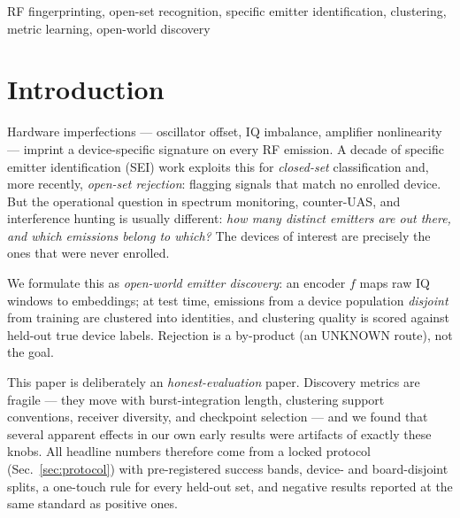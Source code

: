 \documentclass[conference]{IEEEtran}
\begin{document}
\begin{IEEEkeywords}
RF fingerprinting, open-set recognition, specific emitter identification, clustering,
metric learning, open-world discovery
\end{IEEEkeywords}

\section{Introduction}

Hardware imperfections --- oscillator offset, IQ imbalance, amplifier nonlinearity --- imprint a
device-specific signature on every RF emission. A decade of specific emitter identification (SEI)
work exploits this for \emph{closed-set} classification and, more recently, \emph{open-set
rejection}: flagging signals that match no enrolled device. But the operational question in
spectrum monitoring, counter-UAS, and interference hunting is usually different: \emph{how many
distinct emitters are out there, and which emissions belong to which?} The devices of interest are
precisely the ones that were never enrolled.

We formulate this as \emph{open-world emitter discovery}: an encoder $f$ maps raw IQ windows to
embeddings; at test time, emissions from a device population \emph{disjoint} from training are
clustered into identities, and clustering quality is scored against held-out true device labels.
Rejection is a by-product (an UNKNOWN route), not the goal.

This paper is deliberately an \emph{honest-evaluation} paper. Discovery metrics are fragile ---
they move with burst-integration length, clustering support conventions, receiver diversity, and
checkpoint selection --- and we found that several apparent effects in our own early results were
artifacts of exactly these knobs. All headline numbers therefore come from a locked protocol
(Sec.~\ref{sec:protocol}) with pre-registered success bands, device- and board-disjoint splits, a
one-touch rule for every held-out set, and negative results reported at the same standard as
positive ones.
\end{document}
